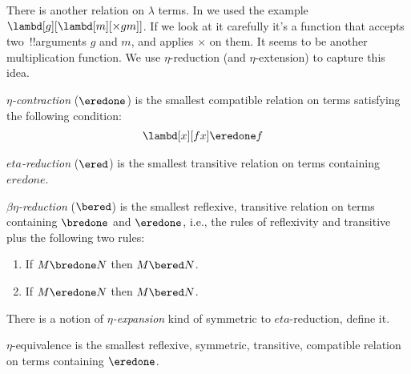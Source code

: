 \documentclass[../../../include/open-logic-section]{subfiles}
\begin{document}

There is another relation on $\lambda$ terms. In
 we used the example $\lambd[g][\lambd[m][\times g
m]]$. If we look at it carefully it's a function that accepts two~!!{argument}s
$g$ and $m$, and applies $\times$ on them. It seems to be another
multiplication function. We use $\eta$-reduction (and $\eta$-extension) to
capture this idea.

\begin{defn}
  \emph{$\eta$-contraction} ($\eredone$) is the smallest compatible relation
  on terms satisfying the following condition:
  \begin{align*}
    &\lambd[x][f x] \eredone f
  \end{align*}
\end{defn}

\begin{defn}
  \emph{$eta$-reduction} ($\ered$) is the smallest transitive relation on terms
  containing $eredone$.
\end{defn}

\begin{defn} 
  \emph{$\beta\eta$-reduction} ($\bered$) is the smallest reflexive,
  transitive relation on terms containing $\bredone$ and $\eredone$,
  i.e., the rules of reflexivity and transitive plus the following two
  rules:
  \begin{enumerate}
  \item If $M \bredone N$ then $M \bered N$. 
  \item If $M \eredone N$ then $M \bered N$. 
  \end{enumerate}
    
\end{defn}

\begin{prob}
  There is a notion of \emph{$\eta$-expansion} kind of symmetric to
  $eta$-reduction, define it.
\end{prob}

\begin{defn}
  $\eta$-equivalence is the smallest reflexive, symmetric, transitive, compatible relation on terms containing $\eredone$.
\end{defn}
\end{document}
